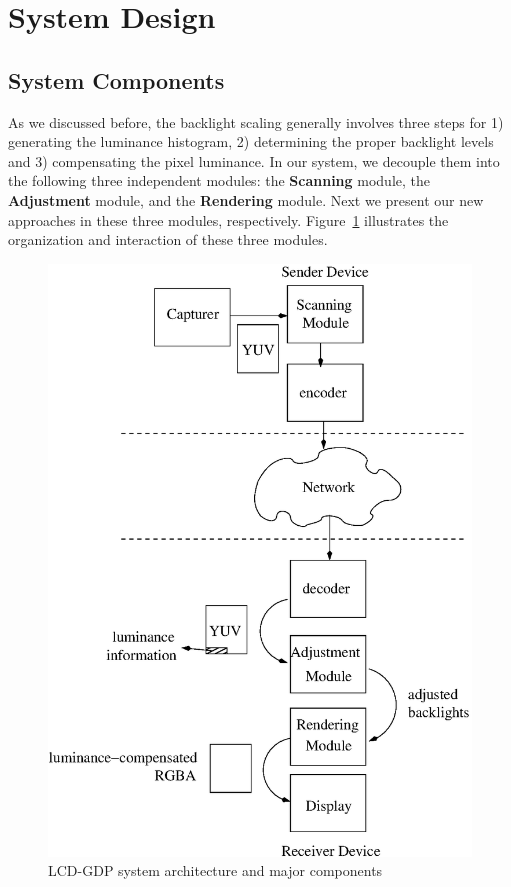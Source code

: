\section{System Design}
\label{sec:design}

\subsection{System Components}
As we discussed before, the backlight scaling generally involves three
steps for 1) generating the luminance histogram, 2) determining the
proper backlight levels and 3) compensating the pixel luminance. In
our system, we decouple them into the following three independent
modules: the {\bf Scanning} module, the {\bf Adjustment} module, and
the {\bf Rendering} module. Next we present our new approaches in
these three modules, respectively. Figure~\ref{fig:design} illustrates
the organization and interaction of these three modules.

\begin{figure}[t]
  \centering
  \includegraphics[width=.45\textwidth]{./figures/design.eps}
  \caption{LCD-GDP system architecture and major components}
\label{fig:design}
\vspace{-2em}
\end{figure}



